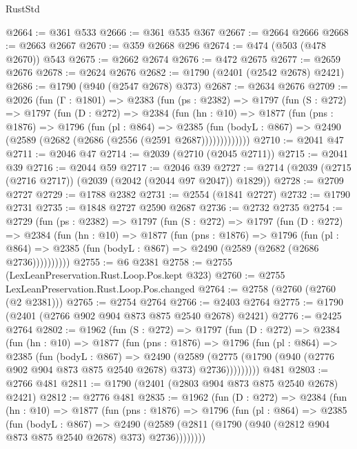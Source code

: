 \begin{lexlean}{RustStd}
\begin{coremodule}
@2664 := @361 @533
@2666 := @361 @535 @367
@2667 := @2664 @2666
@2668 := @2663 @2667
@2670 := @359 @2668 @296
@2674 := @474 (@503 (@478 @2670)) @543
@2675 := @2662 @2674
@2676 := @472 @2675
@2677 := @2659 @2676
@2678 := @2624 @2676
@2682 := @1790 (@2401 (@2542 @2678) @2421)
@2686 := @1790 (@940 (@2547 @2678) @373)
@2687 := @2634 @2676
@2709 := @2026
    (fun (Γ : @1801) =>
    @2383
      (fun (ps : @2382) =>
      @1797
        (fun (S : @272) =>
        @1797
          (fun (D : @272) =>
          @2384
            (fun (hn : @10) =>
            @1877
              (fun (pns : @1876) =>
              @1796
                (fun (pl : @864) =>
                @2385
                  (fun (bodyL : @867) => @2490 (@2589 (@2682 (@2686 (@2556 (@2591 @2687)))))))))))))
@2710 := @2041 @47
@2711 := @2046 @47
@2714 := @2039 (@2710 (@2045 @2711))
@2715 := @2041 @39
@2716 := @2044 @59
@2717 := @2046 @39
@2727 := @2714 (@2039 (@2715 (@2716 @2717)) (@2039 (@2042 (@2044 @97 @2047)) @1829))
@2728 := @2709 @2727
@2729 := @1788 @2382
@2731 := @2554 (@1841 @2727)
@2732 := @1790 @2731
@2735 := @1848 @2727 @2590 @2687
@2736 := @2732 @2735
@2754 := @2729
    (fun (ps : @2382) =>
    @1797
      (fun (S : @272) =>
      @1797
        (fun (D : @272) =>
        @2384
          (fun (hn : @10) =>
          @1877
            (fun (pns : @1876) =>
            @1796
              (fun (pl : @864) =>
              @2385 (fun (bodyL : @867) => @2490 (@2589 (@2682 (@2686 @2736))))))))))
@2755 := @6 @2381
@2758 := @2755 (LexLeanPreservation.Rust.Loop.Pos.kept @323)
@2760 := @2755 LexLeanPreservation.Rust.Loop.Pos.changed
@2764 := @2758 (@2760 (@2760 (@2 @2381)))
@2765 := @2754 @2764
@2766 := @2403 @2764
@2775 := @1790 (@2401 (@2766 @902 @904 @873 @875 @2540 @2678) @2421)
@2776 := @2425 @2764
@2802 := @1962
    (fun (S : @272) =>
    @1797
      (fun (D : @272) =>
      @2384
        (fun (hn : @10) =>
        @1877
          (fun (pns : @1876) =>
          @1796
            (fun (pl : @864) =>
            @2385
              (fun (bodyL : @867) =>
              @2490
                (@2589
                  (@2775 (@1790 (@940 (@2776 @902 @904 @873 @875 @2540 @2678) @373) @2736)))))))))
    @481
@2803 := @2766 @481
@2811 := @1790 (@2401 (@2803 @904 @873 @875 @2540 @2678) @2421)
@2812 := @2776 @481
@2835 := @1962
    (fun (D : @272) =>
    @2384
      (fun (hn : @10) =>
      @1877
        (fun (pns : @1876) =>
        @1796
          (fun (pl : @864) =>
          @2385
            (fun (bodyL : @867) =>
            @2490 (@2589 (@2811 (@1790 (@940 (@2812 @904 @873 @875 @2540 @2678) @373) @2736))))))))

\end{coremodule}
\end{lexlean}

